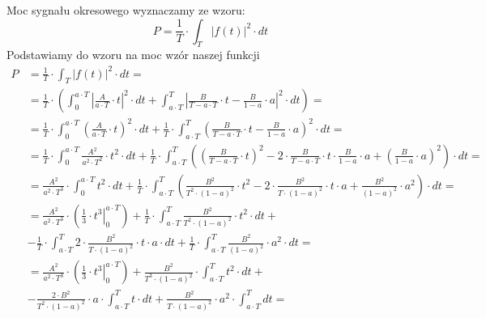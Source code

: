\begin{task}
Moc sygnału okresowego wyznaczamy ze wzoru:
\begin{equation}
P=\frac{1}{T} \cdot \int_{T}^{}\left|f(t)\right|^2 \cdot dt
\end{equation}
Podstawiamy do wzoru na moc wzór naszej funkcji
\begin{align*}
P&=\frac{1}{T} \cdot \int_{T}^{}\left|f(t)\right|^2 \cdot dt=\\
 &=\frac{1}{T} \cdot \left( \int_{0}^{a \cdot T}\left|\frac{A}{a \cdot T}\cdot t \right|^2 \cdot dt
  +\int_{a \cdot T}^{T}\left|\frac{B}{T - a \cdot T}\cdot t - \frac{B}{1 - a} \cdot a\right|^2 \cdot dt \right)=\\ 
 &=\frac{1}{T} \cdot \int_{0}^{a \cdot T}\left(\frac{A}{a \cdot T}\cdot t \right)^2 \cdot dt
  +\frac{1}{T} \cdot \int_{a \cdot T}^{T}\left(\frac{B}{T - a \cdot T}\cdot t - \frac{B}{1 - a} \cdot a\right)^2 \cdot dt=\\ 
 &=\frac{1}{T} \cdot \int_{0}^{a \cdot T}\frac{A^2}{a^2 \cdot T^2}\cdot t^2 \cdot dt
 +\frac{1}{T} \cdot \int_{a \cdot T}^{T}\left(\left(\frac{B}{T - a \cdot T}\cdot t\right)^2 - 2\cdot \frac{B}{T - a \cdot T}\cdot t \cdot  \frac{B}{1 - a} \cdot a + \left( \frac{B}{1 - a} \cdot a\right)^2 \right) \cdot dt=\\
 &=\frac{A^2}{a^2 \cdot T^3}\cdot \int_{0}^{a \cdot T} t^2 \cdot dt
 +\frac{1}{T} \cdot \int_{a \cdot T}^{T}\left(\frac{B^2}{T^2 \cdot \left(1 - a \right)^2}\cdot t^2 - 2\cdot \frac{B^2}{T\cdot \left(1 - a\right)^2}\cdot t \cdot a + \frac{B^2}{\left(1 - a \right)^2} \cdot a^2 \right) \cdot dt=\\
 &=\frac{A^2}{a^2 \cdot T^3}\cdot \left(\left. \frac{1}{3}\cdot t^3 \right|_{0}^{a \cdot T} \right)
 +\frac{1}{T} \cdot \int_{a \cdot T}^{T} \frac{B^2}{T^2 \cdot \left(1 - a \right)^2}\cdot t^2 \cdot dt +\\
 &- \frac{1}{T} \cdot \int_{a \cdot T}^{T} 2\cdot \frac{B^2}{T\cdot \left(1 - a\right)^2}\cdot t \cdot a \cdot dt + \frac{1}{T} \cdot \int_{a \cdot T}^{T} \frac{B^2}{\left(1 - a \right)^2} \cdot a^2 \cdot dt=\\ 
 &=\frac{A^2}{a^2 \cdot T^3}\cdot \left(\left. \frac{1}{3}\cdot t^3 \right|_{0}^{a \cdot T} \right)
 +\frac{B^2}{T^3 \cdot \left(1 - a \right)^2}\cdot \int_{a \cdot T}^{T}  t^2 \cdot dt +\\
 &- \frac{2\cdot B^2}{T^2 \cdot \left(1 - a\right)^2}\cdot a \cdot \int_{a \cdot T}^{T} t \cdot dt 
 + \frac{B^2}{T \cdot \left(1 - a \right)^2} \cdot a^2 \cdot \int_{a \cdot T}^{T} dt=\\

\end{align*}
\end{task}
